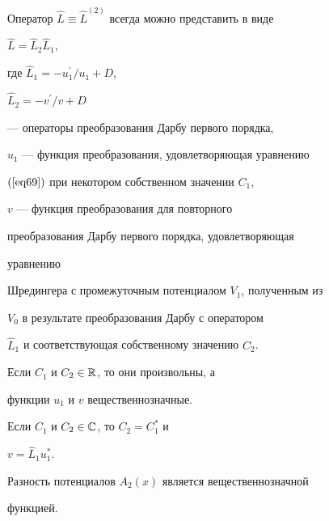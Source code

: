 \begin{lem} Оператор $\widehat{L}\equiv


\widehat{L}^{(2)}$ всегда можно представить в виде


$\widehat{L}=\widehat{L}_2\widehat{L}_1$,


где $\widehat{L}_1=-u_1^{\prime }/u_1+D$,


$\widehat{L}_2=-v^{\prime }/v+D$


--- операторы преобразования Дарбу первого порядка,


$u_1$ --- функция преобразования, удовлетворяющая уравнению


$(\ref{eq69})$  при некотором собственном значении $C_1$,


$v$ --- функция преобразования для повторного


преобразования Дарбу первого порядка, удовлетворяющая


уравнению


Шредингера с промежуточным потенциалом $V_1$, полученным из


$V_0$ в результате преобразования Дарбу с оператором


$\widehat{L}_1$ и соответствующая собственному значению $C_2$.


Если $C_1$ и $C_2\in {\Bbb R} $, то они произвольны, а


функции $u_1$ и $v$  вещественнозначные.


Если $C_1$ и $C_2\in {\Bbb C} $, то $C_2=C_1^{*}$ и


$v=\widehat L_1u_1^{*}$.


Разность потенциалов $A_{2}(x)$ является вещественнозначной


функцией.


\end{lem}





